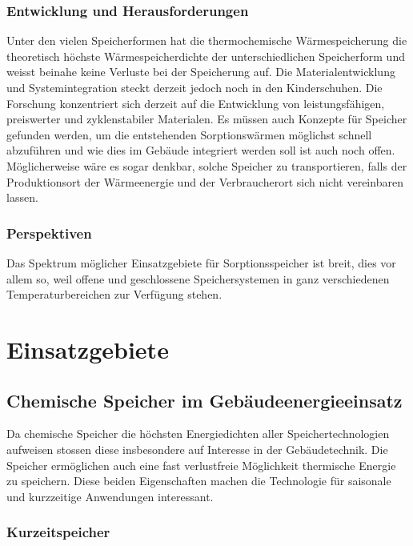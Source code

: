 \documentclass[11pt,a4paper]{scrartcl}
\begin{document}
\subsubsection{Entwicklung und Herausforderungen}
Unter den vielen Speicherformen hat die thermochemische Wärmespeicherung die
theoretisch höchste Wärmespeicherdichte der unterschiedlichen Speicherform und
weisst beinahe keine Verluste bei der Speicherung auf. Die Materialentwicklung
und Systemintegration steckt derzeit jedoch noch in den Kinderschuhen.
Die Forschung konzentriert sich derzeit auf die Entwicklung von
leistungsfähigen, preiswerter und zyklenstabiler Materialen. Es müssen auch
Konzepte für Speicher gefunden werden, um die entstehenden
Sorptionswärmen möglichst schnell abzuführen und wie dies im Gebäude integriert werden soll ist
auch noch offen. Möglicherweise wäre es sogar denkbar, solche Speicher zu
transportieren, falls der Produktionsort der Wärmeenergie und der Verbraucherort
sich nicht vereinbaren lassen.

\subsubsection{Perspektiven}
Das Spektrum möglicher Einsatzgebiete für Sorptionsspeicher ist breit, dies vor
allem so, weil offene und geschlossene Speichersystemen in
ganz verschiedenen Temperaturbereichen zur Verfügung stehen.


\newpage
\section{Einsatzgebiete}
\subsection{Chemische Speicher im Gebäudeenergieeinsatz}
Da chemische Speicher die höchsten Energiedichten aller Speichertechnologien
aufweisen stossen diese insbesondere auf Interesse in
der Gebäudetechnik. Die Speicher ermöglichen auch eine fast verlustfreie
Möglichkeit thermische Energie zu speichern. Diese beiden Eigenschaften machen
die Technologie für saisonale und kurzzeitige Anwendungen interessant.

\subsubsection{Kurzeitspeicher}
\end{document}
